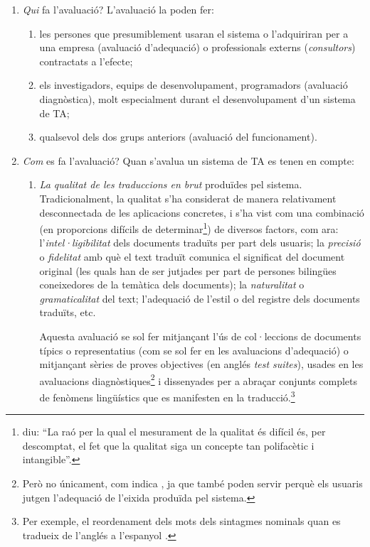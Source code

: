 \begin{enumerate}
\item \emph{Qui} fa l'avaluació? L'avaluació la poden fer:
  \begin{enumerate}
  \item les persones que presumiblement usaran el sistema o
    l'adquiriran per a una empresa (avaluació d'adequació) o
    professionals externs (\emph{consultors}) contractats a l'efecte;
  \item els investigadors, equips de desenvolupament, programadors
    (avaluació diagnòstica), molt especialment durant el
    desenvolupament d'un sistema de TA;
  \item qualsevol dels dos grups anteriors (avaluació del
    funcionament).
  \end{enumerate}
\item \emph{Com} es fa l'avaluació? Quan s'avalua un sistema de TA es
  tenen en compte:
  \begin{enumerate}
  \item \emph{La qualitat de les traduccions en brut} produïdes pel
    sistema. Tradicionalment, la qualitat s'ha considerat de manera
    relativament desconnectada de les aplicacions concretes, i s'ha
    vist com una combinació (en proporcions difícils de
    determinar\footnote{\citet{minnis94j} diu: ``La raó per la qual el
      mesurament de la qualitat és difícil és, per descomptat, el fet
      que la qualitat siga un concepte tan polifacètic i
      intangible''.})  de diversos factors, com ara:
    l'\emph{intel·ligibilitat} dels documents traduïts per part dels
    usuaris; la \emph{precisió} o \emph{fidelitat} amb què el text
    traduït comunica el significat del document original (les quals
    han de ser jutjades per part de persones bilingües coneixedores de
    la temàtica dels documents); la \emph{naturalitat} o
    \emph{gramaticalitat} del text; l'adequació de l'estil o del
    registre dels documents traduïts, etc.

    Aquesta avaluació se sol fer mitjançant l'ús de col·leccions de
    documents típics o representatius (com se sol fer en les
    avaluacions d'adequació) o mitjançant sèries de proves objectives
    (en anglés \emph{test suites}), usades en les avaluacions
    diagnòstiques\footnote{Però no únicament, com indica
      \citet{lewis97j}, ja que també poden servir perquè els usuaris
      jutgen l'adequació de l'eixida produïda pel sistema.} i
    dissenyades per a abraçar conjunts complets de fenòmens
    lingüístics que es manifesten en la traducció.\footnote{Per
      exemple, el reordenament dels mots dels sintagmes nominals quan
      es tradueix de l'anglés a l'espanyol
      \citep{mira98j,forcada00p}.}


\end{enumerate}
\end{enumerate}
